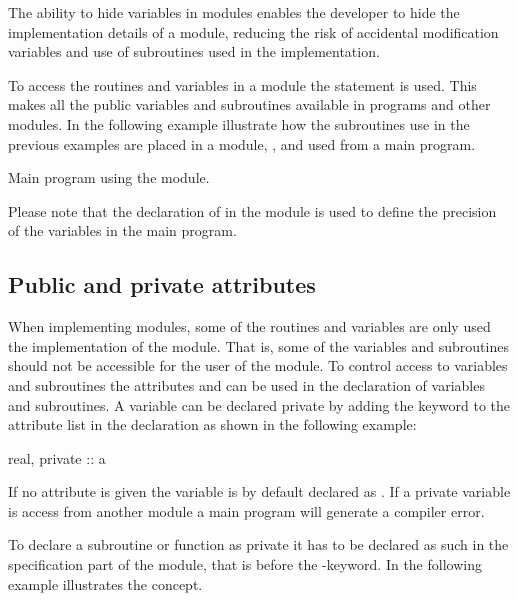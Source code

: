 The ability to hide variables in modules enables the developer to hide the implementation details of a module, reducing the risk of accidental modification variables and use of subroutines used in the implementation.

To access the routines and variables in a module the  statement is used. This makes all the public variables and subroutines available in programs and other modules. In the following example illustrate how the subroutines use in the previous examples are placed in a module, , and used from a main program. 


Main program using the  module.


Please note that the declaration of  in the  module is used to define the precision of the variables in the main program.

\subsection{Public and private attributes}

When implementing modules, some of the routines and variables are only used the implementation of the module. That is, some of the variables and subroutines should not be accessible for the user of the module. To control access to variables and subroutines the attributes  and  can be used in the declaration of variables and subroutines. A variable can be declared private by adding the keyword  to the attribute list in the declaration as shown in the following example:

\begin{fortrancodeenv}
real, private :: a
\end{fortrancodeenv}

If no  attribute is given the variable is by default declared as . If a private variable is access from another module a main program will generate a compiler error. 

To declare a subroutine or function as private it has to be declared as such in the specification part of the module, that is before the -keyword. In the following example illustrates the concept.

